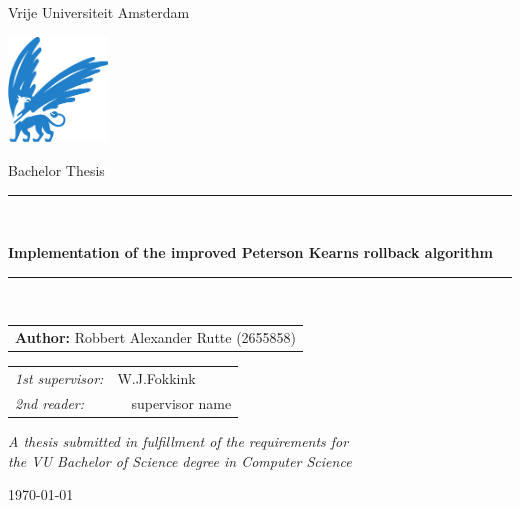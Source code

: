 \documentclass[twocolumn, a4paper,11pt]{article}%
\begin{document}
\thispagestyle{empty}
\onecolumn

\begin{center}

Vrije Universiteit Amsterdam

\vspace{15mm}

\includegraphics[height=28mm]{vu_griffioen.png}

\vspace{1.5cm}

{\Large Bachelor Thesis}

\vspace*{1.5cm}

\rule{.9\linewidth}{.6pt}\\[0.4cm]
{\huge \bfseries Implementation of the improved Peterson Kearns rollback algorithm\par}
{\huge \bfseries \par}\vspace{0.4cm}
\rule{.9\linewidth}{.6pt}\\[1.5cm]

\vspace*{2mm}

{\Large
\begin{tabular}{l}
{\bf Author:}	Robbert Alexander Rutte 	(2655858)
\end{tabular}
}

\vspace*{1.5cm}

\begin{tabular}{ll}
{\it 1st supervisor:}   & W.J.Fokkink \\
{\it 2nd reader:}       & ~~supervisor name
\end{tabular}

\vspace*{2cm}

\textit{A thesis submitted in fulfillment of the requirements for\\ the VU Bachelor of Science degree in Computer Science }

\vspace*{1cm}

\today\\[4cm] %

\end{center}
\end{document}
